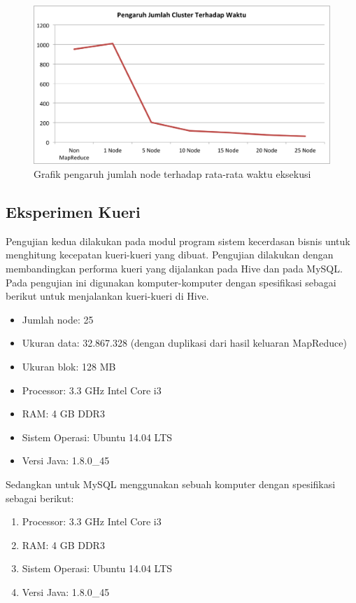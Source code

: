 \begin{figure}[H]
	\centering
	\includegraphics[scale=0.5]{Gambar/eks-node-size.png}
	\caption[Grafik pengaruh jumlah node terhadap rata-rata waktu eksekusi]{Grafik pengaruh jumlah node terhadap rata-rata waktu eksekusi} 
	\label{fig:eks_node_size}
\end{figure}

\subsection{Eksperimen Kueri}
Pengujian kedua dilakukan pada modul program sistem kecerdasan bisnis untuk menghitung kecepatan kueri-kueri yang dibuat. Pengujian dilakukan dengan membandingkan performa kueri yang dijalankan pada Hive dan pada MySQL. Pada pengujian ini digunakan komputer-komputer dengan spesifikasi sebagai berikut untuk menjalankan kueri-kueri di Hive.
\begin{itemize}
	\item Jumlah node: 25 
	\item Ukuran data: 32.867.328 (dengan duplikasi dari hasil keluaran MapReduce)
	\item Ukuran blok: 128 MB
	\item Processor: 3.3 GHz Intel Core i3
	\item RAM: 4 GB DDR3
	\item Sistem Operasi: Ubuntu 14.04 LTS
	\item Versi Java: 1.8.0\_45
\end{itemize}

Sedangkan untuk MySQL menggunakan sebuah komputer dengan spesifikasi sebagai berikut:
\begin{enumerate}
	\item Processor: 3.3 GHz Intel Core i3
	\item RAM: 4 GB DDR3
	\item Sistem Operasi: Ubuntu 14.04 LTS
	\item Versi Java: 1.8.0\_45
\end{enumerate}

